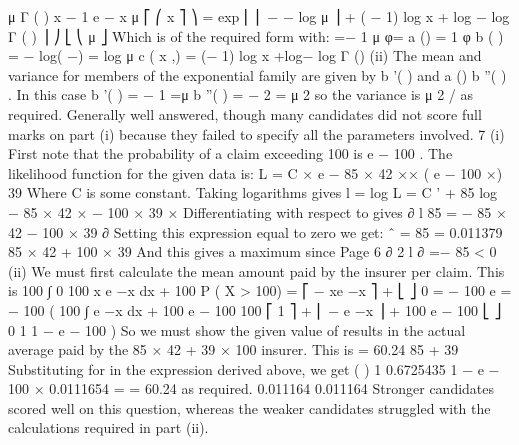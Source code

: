 \documentclass[a4paper,12pt]{article}
\begin{document}
μ \alpha  Γ ( \alpha  )
x
\alpha − 1
e
−
x \alpha 
μ
⎡ ⎛ x
⎤
⎞
= exp ⎢ ⎜ − − log μ ⎟ \alpha  + ( \alpha  − 1) log x + \alpha  log \alpha  − log Γ ( \alpha  ) ⎥
⎠
⎣ ⎝ μ
⎦
Which is of the required form with:
\theta =−
1
μ
φ=\alpha 
a (\phi  ) =
1
φ
b ( \theta  ) = − log( −\theta  ) = log μ
c ( x ,\phi  ) = (\phi  − 1) log x +\phi  log\phi  − log Γ (\phi  )
(ii)
The mean and variance for members of the exponential family are given by
b '( \theta  ) and a (\phi  ) b ''( \theta  ) .
In this case b '( \theta  ) = −
1
=μ
\theta 
b ''( \theta  ) = \theta  − 2 = μ 2 so the variance is μ 2 / \alpha  as required.
Generally well answered, though many candidates did not score full marks on part (i)
because they failed to specify all the parameters involved.
7
(i)
First note that the probability of a claim exceeding 100 is e − 100 \lambda  .
The likelihood function for the given data is:
L = C ×  e − 85 × 42 ×\lambda  × ( e − 100 ×\lambda  ) 39
Where C is some constant. Taking logarithms gives
l = log L = C ' + 85 log \lambda  − 85 × 42 × \lambda  − 100 × 39 × \lambda 
Differentiating with respect to \lambda  gives
∂ l 85
=
− 85 × 42 − 100 × 39
∂\lambda  \lambda 
Setting this expression equal to zero we get:
\lambda  ˆ =
85
= 0.011379
85 × 42 + 100 × 39
And this gives a maximum since
Page 6
∂ 2 l
∂
=−
85
< 0
(ii)
We must first calculate the mean amount paid by the insurer per claim. This is
100
∫
0
100
x \lambda  e −\lambda  x dx + 100 P ( X > 100) = ⎡ − xe −\lambda  x ⎤ +
⎣
⎦ 0
= − 100 e
=
− 100 \lambda 
(
100
∫ e
−\lambda  x
dx + 100 e − 100 
100
⎡ 1
⎤
+ ⎢ − e −\lambda  x ⎥ + 100 e − 100 \lambda 
⎣ \lambda 
⎦ 0
1
1 − e − 100 \lambda 
\lambda 
)
So we must show the given value of \lambda  results in the actual average paid by the
85 × 42 + 39 × 100
insurer. This is
= 60.24
85 + 39
Substituting for \lambda  in the expression derived above, we get
(
)
1
0.6725435
1 − e − 100 × 0.0111654 =
= 60.24 as required.
0.011164
0.011164
Stronger candidates scored well on this question, whereas the weaker candidates struggled
with the calculations required in part (ii).
\end{document}

